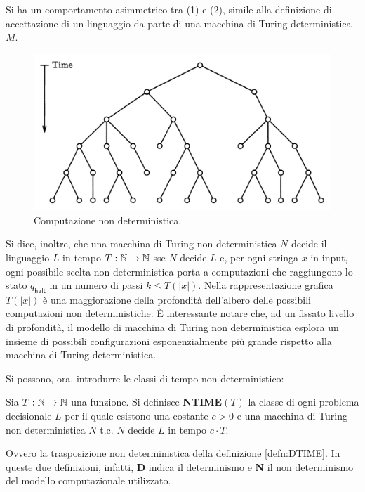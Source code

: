 Si ha un comportamento asimmetrico tra (1) e (2), simile alla definizione di accettazione di un linguaggio da parte di una macchina di Turing deterministica $M$.

\begin{figure}[h]
\begin{center}
 \includegraphics[width=\textwidth]{Images/Albero_configurazioni}
\end{center}
\caption{Computazione non deterministica.}\label{fig:Conf_tree}
\end{figure}

Si dice, inoltre, che una macchina di Turing non deterministica $N$ decide il linguaggio $L$ in tempo $T: \mathbb{N} \to \mathbb{N}$ sse $N$ decide $L$ e, per ogni stringa $x$ in input, ogni possibile scelta non deterministica porta a computazioni che raggiungono lo stato $q_{\mathsf{halt}}$ in un numero di passi $k \leq T(|x|)$.
Nella rappresentazione grafica $T(|x|)$ è una maggiorazione della profondità dell'albero delle possibili computazioni non deterministiche.
È interessante notare che, ad un fissato livello di profondità, il modello di macchina di Turing non deterministica esplora un insieme di possibili configurazioni esponenzialmente più grande rispetto alla macchina di Turing deterministica.

Si possono, ora, introdurre le classi di tempo non deterministico:
\begin{defn}\label{defn:NTIME}
 Sia $T: \mathbb{N} \to \mathbb{N}$ una funzione.
 Si definisce \textbf{NTIME}$(T)$ la classe di ogni problema decisionale $L$ per il quale esistono una costante $c > 0$ e una macchina di Turing non deterministica $N$ t.c. $N$ decide $L$ in tempo $c \cdot T$.
\end{defn}
Ovvero la trasposizione non deterministica della definizione \ref{defn:DTIME}.
In queste due definizioni, infatti, \textbf{D} indica il determinismo e \textbf{N} il non determinismo del modello computazionale utilizzato.

